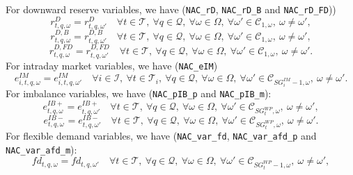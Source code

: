 For downward reserve variables, we have (\verb|NAC_rD|, \verb|NAC_rD_B| and \verb|NAC_rD_FD|))
\begin{equation} \label{EQ:NAC_pVRD2}
	r^D_{t,q, \omega} = r^D_{t, q,\omega'} \quad \forall t \in \mathcal{T}, \ \forall q \in \mathcal{Q}, \ \forall \omega \in \Omega, \ \forall \omega' \in \mathcal{C}_{1, \omega}, \ \omega \neq \omega',
\end{equation}
\begin{equation} \label{EQ:NAC_rDB2}
	r^{D, B}_{t,q, \omega} = r^{D, B}_{t,q, \omega'} \quad \forall t \in \mathcal{T}, \ \forall q \in \mathcal{Q}, \ \forall \omega \in \Omega, \ \forall \omega' \in \mathcal{C}_{1, \omega}, \ \omega \neq \omega',
\end{equation}
\begin{equation} \label{EQ:NAC_rDFD2}
	r^{D, FD}_{t,q, \omega} = r^{D, FD}_{t,q, \omega'} \quad \forall t \in \mathcal{T}, \ \forall q \in \mathcal{Q},  \ \forall \omega \in \Omega, \ \forall \omega' \in \mathcal{C}_{1, \omega}, \ \omega \neq \omega'.
\end{equation}
For intraday market variables, we have (\verb|NAC_eIM|)
\begin{equation} \label{EQ:NAC_mUC2}
	e^{IM}_{i, t,q, \omega} = e^{IM}_{i, t,q, \omega'} \quad \forall i \in \mathcal{I}, \ \forall t \in \mathcal{T}_i, \ \forall q \in \mathcal{Q}, \ \forall \omega \in \Omega, \ \forall \omega' \in \mathcal{C}_{SG^{IM}_i -1, \omega}, \ \omega \neq \omega'.
\end{equation}
For imbalance variables, we have (\verb|NAC_pIB_p| and \verb|NAC_pIB_m|):
\begin{equation} \label{EQ:NAC_pPIB2}
	e^{IB+}_{t,q, \omega} = e^{IB+}_{t,q, \omega'} \quad \forall t \in \mathcal{T}, \ \forall q \in \mathcal{Q}, \ \forall \omega \in \Omega, \ \forall \omega' \in \mathcal{C}_{SG^{WP}_t, \omega}, \ \omega \neq \omega',
\end{equation}
\begin{equation} \label{EQ:NAC_pNIB2}
	e^{IB-}_{t,q, \omega} = e^{IB-}_{t,q, \omega'} \quad \forall t \in \mathcal{T}, \ \forall q \in \mathcal{Q}, \ \forall \omega \in \Omega, \ \forall \omega' \in \mathcal{C}_{SG^{WP}_t, \omega}, \ \omega \neq \omega'.
\end{equation}
For flexible demand variables, we have (\verb|NAC_var_fd|, \verb|NAC_var_afd_p| and \verb|NAC_var_afd_m|):
\begin{equation} \label{EQ:NAC_var_fd2}
	fd_{t, q,\omega} = fd_{t, q,\omega'} \quad \forall t \in \mathcal{T}, \ \forall q \in \mathcal{Q},  \ \forall \omega \in \Omega, \ \forall \omega' \in \mathcal{C}_{SG^{WP}_t - 1, \omega}, \ \omega \neq \omega',
\end{equation}
